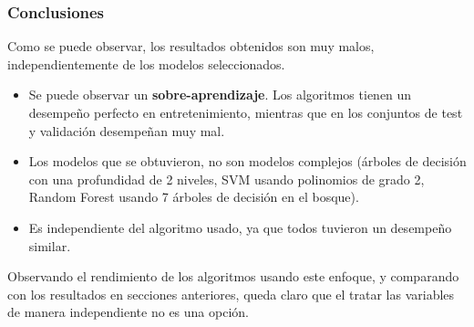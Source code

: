 \subsubsection*{Conclusiones}
Como se puede observar, los resultados obtenidos son muy malos, independientemente de los modelos seleccionados.
\begin{itemize}
	\item Se puede observar un \textbf{sobre-aprendizaje}. Los algoritmos tienen un desempeño perfecto en entretenimiento, mientras que en los conjuntos de test y validación desempeñan muy mal.
	\item Los modelos que se obtuvieron, no son modelos complejos (árboles de decisión con una profundidad de 2 niveles, SVM usando polinomios de grado 2, Random Forest usando 7 árboles de decisión en el bosque).
	\item Es independiente del algoritmo usado, ya que todos tuvieron un desempeño similar.
\end{itemize}
Observando el rendimiento de los algoritmos usando este enfoque, y comparando con los resultados en secciones anteriores, queda claro que el tratar las variables de manera independiente no es una opción.
